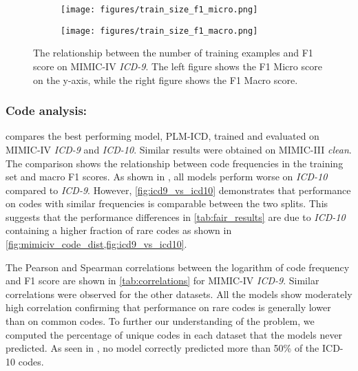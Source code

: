 \documentclass[anonymous=false, sigconf=true, review=false, natbib=true]{acmart}
\begin{document}
\begin{figure*}[h]
    \centering
    \begin{subfigure}[b]{0.48\textwidth}
        \centering
        \texttt{[image: figures/train\_size\_f1\_micro.png]}
\end{subfigure}
    \hspace{3mm}
    \begin{subfigure}[b]{0.48\textwidth}
        \centering
        \texttt{[image: figures/train\_size\_f1\_macro.png]}
\end{subfigure}
    \caption{The relationship between the number of training examples and F1 score on MIMIC-IV \textit{ICD-9}. The left figure shows the F1 Micro score on the y-axis, while the right figure shows the F1 Macro score.}
    \label{fig:train_size}
\end{figure*}









\subsubsection{Code analysis:}

 compares the best performing model, PLM-ICD, trained and evaluated on MIMIC-IV \textit{ICD-9} and \textit{ICD-10}. Similar results were obtained on MIMIC-III \textit{clean}.
The comparison shows the relationship between code frequencies in the training set and macro F1 scores. As shown in , all models perform worse on \textit{ICD-10} compared to \textit{ICD-9}. However, \cref{fig:icd9_vs_icd10} demonstrates that performance on codes with similar frequencies is comparable between the two splits. This suggests that the performance differences in \cref{tab:fair_results} are due to \textit{ICD-10} containing a higher fraction of rare codes as shown in \cref{fig:mimiciv_code_dist,fig:icd9_vs_icd10}.

The Pearson and Spearman correlations between the logarithm of code frequency and F1 score are shown in \cref{tab:correlations} for MIMIC-IV \textit{ICD-9}. Similar correlations were observed for the other datasets. All the models show moderately high correlation confirming that performance on rare codes is generally lower than on common codes. To further our understanding of the problem, we computed the percentage of unique codes in each dataset that the models never predicted. As seen in , no model correctly predicted more than 50\% of the ICD-10 codes.
\end{document}
